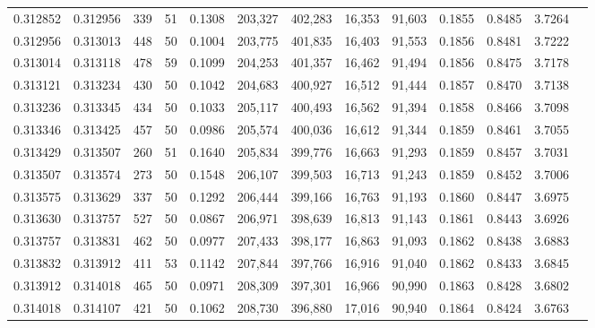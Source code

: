 \begin{tabular}{rrrrrrrrrrrrr}
0.312852 & 0.312956 &   339 &  51 &                                     0.1308 & 203,327 & 402,283 &  16,353 &  91,603 & 0.1855 & 0.8485 & 3.7264 \\
0.312956 & 0.313013 &   448 &  50 &                                     0.1004 & 203,775 & 401,835 &  16,403 &  91,553 & 0.1856 & 0.8481 & 3.7222 \\
0.313014 & 0.313118 &   478 &  59 &                                     0.1099 & 204,253 & 401,357 &  16,462 &  91,494 & 0.1856 & 0.8475 & 3.7178 \\
0.313121 & 0.313234 &   430 &  50 &                                     0.1042 & 204,683 & 400,927 &  16,512 &  91,444 & 0.1857 & 0.8470 & 3.7138 \\
0.313236 & 0.313345 &   434 &  50 &                                     0.1033 & 205,117 & 400,493 &  16,562 &  91,394 & 0.1858 & 0.8466 & 3.7098 \\
0.313346 & 0.313425 &   457 &  50 &                                     0.0986 & 205,574 & 400,036 &  16,612 &  91,344 & 0.1859 & 0.8461 & 3.7055 \\
0.313429 & 0.313507 &   260 &  51 &                                     0.1640 & 205,834 & 399,776 &  16,663 &  91,293 & 0.1859 & 0.8457 & 3.7031 \\
0.313507 & 0.313574 &   273 &  50 &                                     0.1548 & 206,107 & 399,503 &  16,713 &  91,243 & 0.1859 & 0.8452 & 3.7006 \\
0.313575 & 0.313629 &   337 &  50 &                                     0.1292 & 206,444 & 399,166 &  16,763 &  91,193 & 0.1860 & 0.8447 & 3.6975 \\
0.313630 & 0.313757 &   527 &  50 &                                     0.0867 & 206,971 & 398,639 &  16,813 &  91,143 & 0.1861 & 0.8443 & 3.6926 \\
0.313757 & 0.313831 &   462 &  50 &                                     0.0977 & 207,433 & 398,177 &  16,863 &  91,093 & 0.1862 & 0.8438 & 3.6883 \\
0.313832 & 0.313912 &   411 &  53 &                                     0.1142 & 207,844 & 397,766 &  16,916 &  91,040 & 0.1862 & 0.8433 & 3.6845 \\
0.313912 & 0.314018 &   465 &  50 &                                     0.0971 & 208,309 & 397,301 &  16,966 &  90,990 & 0.1863 & 0.8428 & 3.6802 \\
0.314018 & 0.314107 &   421 &  50 &                                     0.1062 & 208,730 & 396,880 &  17,016 &  90,940 & 0.1864 & 0.8424 & 3.6763 \\

\end{tabular}

